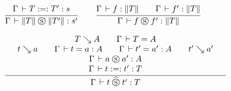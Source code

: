 \documentclass[a4paper,english]{lipics-utf8x}
\begin{document}
  \begin{center}
  \(
    \ru{\Gamma \der T :=: T' : s
      }{\Gamma \der \squash{T} \Sr \squash{T'} : s'}
    \qquad
    \ru{\Gamma \der f : \squash{T} \qquad
        \Gamma \der f' : \squash{T}
      }{\Gamma \der f \Sr f' : \squash{T}}
  \)
  \end{center}

  \begin{center}
  \(
    \qru{T \rew A \qquad
         \Gamma \der T = A
       }{t \rew a \qquad
         \Gamma \der t = a : A \qquad
         \Gamma \der t' = a' : A \qquad
         t' \rew a'
       }{\Gamma \der a \Sr a' : A
       }{\Gamma \der t :=: t' : T
       }{\Gamma \der t \hSr t' : T}
  \)
  \end{center}
\end{document}
